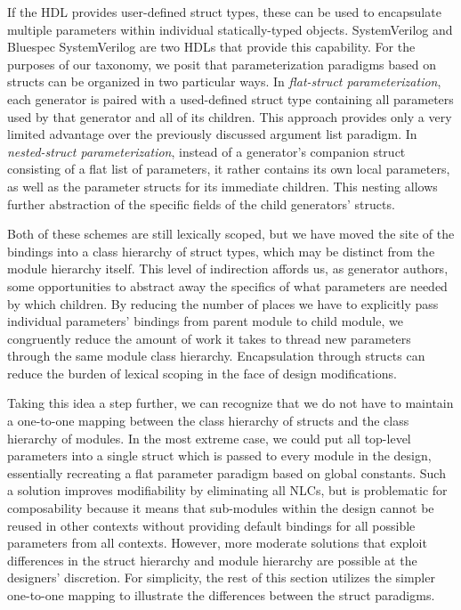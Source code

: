 If the HDL provides user-defined struct types, these can be used to encapsulate multiple parameters within individual statically-typed objects.
SystemVerilog and Bluespec SystemVerilog are two HDLs that provide this capability.
For the purposes of our taxonomy, we posit that parameterization paradigms based on structs can be organized in two particular ways.
In \emph{flat-struct parameterization}, each generator is paired with a used-defined struct type containing all parameters used by that generator and all of its children.
This approach provides only a very limited advantage over the previously discussed argument list paradigm.
In \emph{nested-struct parameterization}, instead of a generator's companion struct consisting of a flat list of parameters,
it rather contains its own local parameters, as well as the parameter structs for its immediate children. 
This nesting allows further abstraction of the specific fields of the child generators' structs.

Both of these schemes are still lexically scoped, but we have moved the site of the bindings into a class hierarchy of struct types,
which may be distinct from the module hierarchy itself.
This level of indirection affords us, as generator authors, some opportunities to abstract away the specifics of what parameters are needed by which children.
By reducing the number of places we have to explicitly pass individual parameters' bindings from parent module to child module, we congruently reduce
the amount of work it takes to thread new parameters through the same module class hierarchy.
Encapsulation through structs can reduce the burden of lexical scoping in the face of design modifications.

Taking this idea a step further, we can recognize that we do not have to maintain a one-to-one mapping between the class hierarchy of structs and the class hierarchy of modules.
In the most extreme case, we could put all top-level parameters into a single struct which is passed to every module in the design,
essentially recreating a flat parameter paradigm based on global constants.
Such a solution improves modifiability by eliminating all NLCs, but is problematic for composability
because it means that sub-modules within the design cannot be reused in other contexts without providing default bindings for all possible parameters from all contexts.
However, more moderate solutions that exploit differences in the struct hierarchy and module hierarchy are possible at the designers' discretion.
For simplicity, the rest of this section utilizes the simpler one-to-one mapping to illustrate the differences between the struct paradigms.

